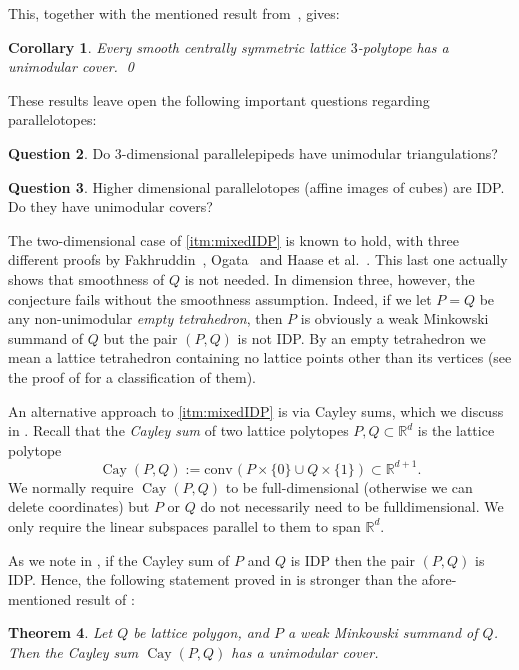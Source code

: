 \documentclass{amsart}
\theoremstyle{plain}
\newtheorem{theorem}{Theorem}[section]
\newtheorem{corollary}[theorem]{Corollary}
\theoremstyle{definition}
\newtheorem{question}[theorem]{Question}
\newcommand{\R}{ \ensuremath{\mathbb{R}}}
\newcommand{\conv}{\ensuremath{\mathrm{conv}}\hspace{1pt}}
\newcommand{\cayley}{\operatorname{Cay}}
\begin{document}
This, together with the mentioned result from~\cite{BHHHJKM2019}, gives:

\begin{corollary}
\label{coro:3cs}
Every smooth centrally symmetric lattice $3$-polytope has a unimodular cover. 
\qed
\end{corollary}

These results leave open the following important questions regarding parallelotopes:

\begin{question}
Do $3$-dimensional parallelepipeds have unimodular triangulations?
\end{question}

\begin{question}
Higher dimensional parallelotopes (affine images of cubes) are IDP. Do they have unimodular covers? 
\end{question}


The two-dimensional case of \eqref{itm:mixedIDP} is known to hold, with three different proofs by Fakhruddin~\cite{Fakhruddin}, Ogata~\cite{Ogata} and Haase et al.~\cite{HNPS2008}. This last one actually shows that smoothness of $Q$ is not needed. In dimension three, however, the conjecture fails without the smoothness assumption. Indeed, if we let $P=Q$ be any non-unimodular \emph{empty tetrahedron}, then $P$ is obviously a weak Minkowski summand of $Q$ but the pair $(P, Q)$ is not IDP. By an empty tetrahedron we mean a lattice tetrahedron containing no lattice points other than its vertices (see the proof of  for a classification of them).

An alternative approach to \eqref{itm:mixedIDP} is via Cayley sums, which we discuss in  . 
Recall that the \emph{Cayley sum} of two lattice polytopes $P,Q\subset \R^d$ is the lattice polytope
\[
\cayley(P,Q) := \conv(P\times\{0\} \cup Q \times \{1\}) \subset \R^{d+1}.
\]
We normally require $\cayley(P,Q)$ to be full-dimensional (otherwise we can delete coordinates) but $P$ or $Q$ do not necessarily need to be fulldimensional. We only require the linear subspaces parallel to them to span $\R^d$.

As we note in , if the Cayley sum of $P$ and $Q$ is IDP then the pair $(P,Q)$ is IDP.
Hence, the following statement proved in  is stronger than the afore-mentioned result of \cite{Fakhruddin,HNPS2008,Ogata}:

\begin{theorem}
\label{thm:cayley}
Let $Q$ be lattice polygon, and $P$ a weak Minkowski summand of $Q$. Then the Cayley sum $\cayley(P,Q)$ has a unimodular cover.
\end{theorem}
\end{document}
